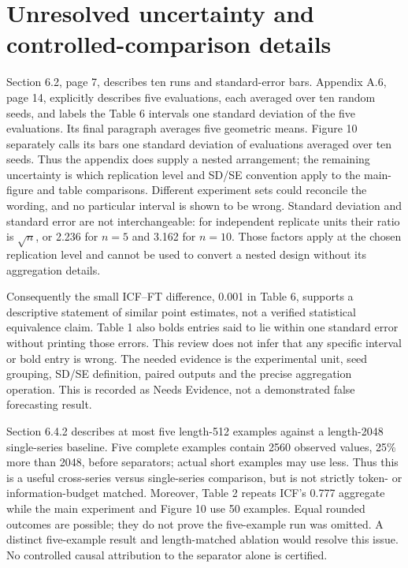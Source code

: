 \documentclass[10pt]{article}
\begin{document}
\section*{Unresolved uncertainty and controlled-comparison details}
Section 6.2, page 7, describes ten runs and standard-error bars. Appendix A.6, page 14, explicitly describes five evaluations, each averaged over ten random seeds, and labels the Table 6 intervals one standard deviation of the five evaluations. Its final paragraph averages five geometric means. Figure 10 separately calls its bars one standard deviation of evaluations averaged over ten seeds. Thus the appendix does supply a nested arrangement; the remaining uncertainty is which replication level and SD/SE convention apply to the main-figure and table comparisons. Different experiment sets could reconcile the wording, and no particular interval is shown to be wrong. Standard deviation and standard error are not interchangeable: for independent replicate units their ratio is \(\sqrt n\), or 2.236 for \(n=5\) and 3.162 for \(n=10\). Those factors apply at the chosen replication level and cannot be used to convert a nested design without its aggregation details.\par
Consequently the small ICF–FT difference, 0.001 in Table 6, supports a descriptive statement of similar point estimates, not a verified statistical equivalence claim. Table 1 also bolds entries said to lie within one standard error without printing those errors. This review does not infer that any specific interval or bold entry is wrong. The needed evidence is the experimental unit, seed grouping, SD/SE definition, paired outputs and the precise aggregation operation. This is recorded as Needs Evidence, not a demonstrated false forecasting result.\par
Section 6.4.2 describes at most five length-512 examples against a length-2048 single-series baseline. Five complete examples contain 2560 observed values, 25\% more than 2048, before separators; actual short examples may use less. Thus this is a useful cross-series versus single-series comparison, but is not strictly token- or information-budget matched. Moreover, Table 2 repeats ICF’s 0.777 aggregate while the main experiment and Figure 10 use 50 examples. Equal rounded outcomes are possible; they do not prove the five-example run was omitted. A distinct five-example result and length-matched ablation would resolve this issue. No controlled causal attribution to the separator alone is certified.\par
\end{document}
